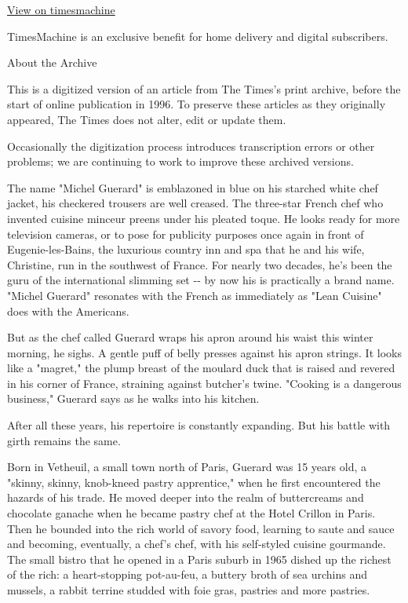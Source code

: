 \href{http://timesmachine.nytimes3xbfgragh.onion/timesmachine/1992/02/09/049792.html}{View
on timesmachine}

TimesMachine is an exclusive benefit for home delivery and digital
subscribers.

About the Archive

This is a digitized version of an article from The Times's print
archive, before the start of online publication in 1996. To preserve
these articles as they originally appeared, The Times does not alter,
edit or update them.

Occasionally the digitization process introduces transcription errors or
other problems; we are continuing to work to improve these archived
versions.

The name "Michel Guerard" is emblazoned in blue on his starched white
chef jacket, his checkered trousers are well creased. The three-star
French chef who invented cuisine minceur preens under his pleated toque.
He looks ready for more television cameras, or to pose for publicity
purposes once again in front of Eugenie-les-Bains, the luxurious country
inn and spa that he and his wife, Christine, run in the southwest of
France. For nearly two decades, he's been the guru of the international
slimming set -\/- by now his is practically a brand name. "Michel
Guerard" resonates with the French as immediately as "Lean Cuisine" does
with the Americans.

But as the chef called Guerard wraps his apron around his waist this
winter morning, he sighs. A gentle puff of belly presses against his
apron strings. It looks like a "magret," the plump breast of the moulard
duck that is raised and revered in his corner of France, straining
against butcher's twine. "Cooking is a dangerous business," Guerard says
as he walks into his kitchen.

After all these years, his repertoire is constantly expanding. But his
battle with girth remains the same.

Born in Vetheuil, a small town north of Paris, Guerard was 15 years old,
a "skinny, skinny, knob-kneed pastry apprentice," when he first
encountered the hazards of his trade. He moved deeper into the realm of
buttercreams and chocolate ganache when he became pastry chef at the
Hotel Crillon in Paris. Then he bounded into the rich world of savory
food, learning to saute and sauce and becoming, eventually, a chef's
chef, with his self-styled cuisine gourmande. The small bistro that he
opened in a Paris suburb in 1965 dished up the richest of the rich: a
heart-stopping pot-au-feu, a buttery broth of sea urchins and mussels, a
rabbit terrine studded with foie gras, pastries and more pastries.

